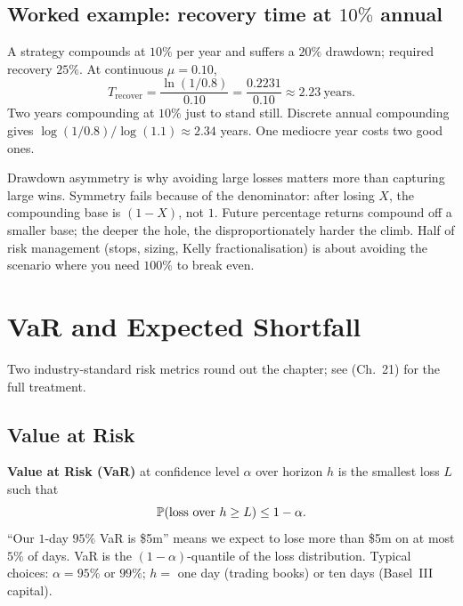 \subsection{Worked example: recovery time at $10\%$ annual}

A strategy compounds at $10\%$ per year and suffers a $20\%$
drawdown; required recovery $25\%$. At continuous $\mu = 0.10$,
\begin{equation}
  T_{\text{recover}}
  = \frac{\ln(1 / 0.8)}{0.10}
  = \frac{0.2231}{0.10}
  \approx 2.23~\text{years}.
\end{equation}
Two years compounding at $10\%$ just to stand still. Discrete
annual compounding gives $\log(1/0.8)/\log(1.1) \approx 2.34$
years. One mediocre year costs two good ones.

\begin{intuitionbox}
Drawdown asymmetry is why avoiding large losses matters more than
capturing large wins. Symmetry fails because of the denominator:
after losing $X$, the compounding base is $(1-X)$, not $1$.
Future percentage returns compound off a smaller base; the deeper
the hole, the disproportionately harder the climb. Half of risk
management (stops, sizing, Kelly fractionalisation) is
about avoiding the scenario where you need $100\%$ to break even.
\end{intuitionbox}

\section{VaR and Expected Shortfall}
\label{sec:var_es}

Two industry-standard risk metrics round out the chapter; see
\citeHull{} (Ch.\ 21) for the full treatment.

\subsection{Value at Risk}

\textbf{Value at Risk (VaR)} at confidence level $\alpha$ over
horizon $h$ is the smallest loss $L$ such that
\begin{equation}
  \mathbb{P}(\text{loss over } h \geq L) \leq 1 - \alpha.
\end{equation}
``Our $1$-day $95\%$ VaR is \$5m'' means we expect to lose more
than \$5m on at most $5\%$ of days. VaR is the
$(1-\alpha)$-quantile of the loss distribution. Typical choices:
$\alpha = 95\%$ or $99\%$; $h =$ one day (trading books) or ten
days (Basel~III capital).

